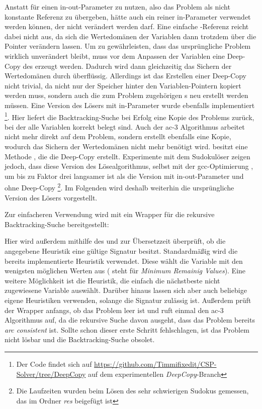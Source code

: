 Anstatt für  einen in-out-Parameter zu nutzen, also das Problem als nicht konstante Referenz zu übergeben, hätte auch ein reiner in-Parameter verwendet
werden können, der nicht verändert werden darf. Eine einfache -Referenz reicht dabei nicht aus, da sich die Wertedomänen der Variablen dann trotzdem über die
Pointer verändern lassen. Um zu gewährleisten, dass das ursprüngliche Problem wirklich unverändert bleibt, muss vor dem Anpassen der Variablen eine Deep-Copy des 
erzeugt werden. Dadurch wird dann gleichzeitig das Sichern der Wertedomänen durch  überflüssig. Allerdings ist das Erstellen einer Deep-Copy nicht
trivial, da nicht nur der Speicher hinter den Variablen-Pointern kopiert werden muss, sondern auch die zum Problem zugehörigen s neu erstellt werden müssen. Eine
Version des Lösers mit in-Parameter wurde ebenfalls implementiert \footnote{Der Code findet sich auf \url{https://github.com/Timmifixedit/CSP-Solver/tree/DeepCopy} auf dem
experimentellen \textit{DeepCopy}-Branch}. Hier liefert die Backtracking-Suche bei Erfolg eine Kopie des Problems zurück, bei der alle Variablen korrekt belegt sind. Auch der
\ac*{ac}-3 Algorithmus arbeitet nicht mehr direkt auf dem Problem, sondern erstellt ebenfalls eine Kopie, wodurch das Sichern der Wertedomänen nicht mehr benötigt wird.
 besitzt eine Methode , die die Deep-Copy erstellt. Experimente mit dem Sudokulöser zeigen jedoch, dass diese Version des Lösealgorithmus, selbst
mit der gcc-Optimierung , um bis zu Faktor drei langsamer ist als die Version mit in-out-Parameter und ohne Deep-Copy \footnote{Die Laufzeiten wurden beim Lösen des
sehr schwierigen Sudokus gemessen, das im Ordner \textit{res} beigefügt ist}. Im Folgenden wird deshalb weiterhin die ursprüngliche Version des Lösers vorgestellt.

Zur einfacheren Verwendung wird mit  ein Wrapper für die rekursive Backtracking-Suche bereitgestellt:

Hier wird außerdem mithilfe des  und  zur Übersetzzeit überprüft, ob die angegebene Heuristik eine gültige Signatur besitzt.
Standardmäßig wird die bereits implementierte Heuristik  verwendet. Diese wählt die Variable mit den wenigsten möglichen Werten aus ( steht
für \textit{Minimum Remainig Values}). Eine weitere Möglichkeit ist die  Heuristik, die einfach die nächstbeste nicht zugewiesene Variable auswählt.
Darüber hinaus lassen sich aber auch beliebige eigene Heuristiken verwenden, solange die Signatur zulässig ist. Außerdem prüft der Wrapper anfangs, ob das Problem leer ist und ruft
einmal den \ac*{ac}-3 Algorithmus auf, da die rekursive Suche davon ausgeht, dass das Problem bereits \textit{arc consistent} ist. Sollte schon dieser erste Schritt fehlschlagen,
ist das Problem nicht lösbar und die Backtracking-Suche obsolet.